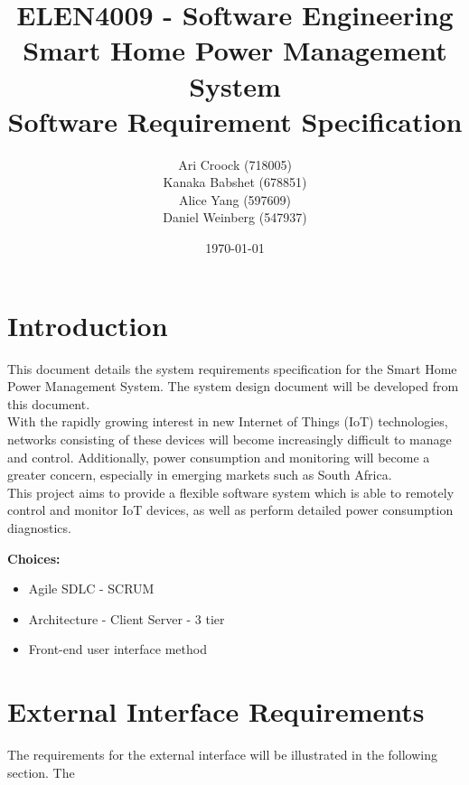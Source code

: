 \documentclass[11pt, a4paper]{article}
\title{ELEN4009 - Software Engineering\\Smart Home Power Management System\\Software Requirement Specification}
\author{Ari Croock (718005)\\Kanaka Babshet (678851)\\Alice Yang (597609)\\Daniel Weinberg (547937)}
\date{\today}
\begin{document}
	\maketitle
	\section{Introduction}
	
	This document details the system requirements specification for the Smart Home Power Management System. The system design document will be developed from this document.\\
	
	With the rapidly growing interest in new Internet of Things (IoT) technologies, networks consisting of these devices will become increasingly difficult to manage and control. Additionally, power consumption and monitoring will become a greater concern, especially in emerging markets such as South Africa.\\
	
	This project aims to provide a flexible software system which is able to remotely control and monitor IoT devices, as well as perform detailed power consumption diagnostics.
	
	\textbf{Choices:} 
	\begin{itemize}
		\item Agile SDLC - SCRUM 
		\item Architecture - Client Server - 3 tier
		\item Front-end user interface method
	\end{itemize}
	
	
	\section{External Interface Requirements}
	The requirements for the external interface will be illustrated in the following section. The 
	
	
	
	
\end{document}
